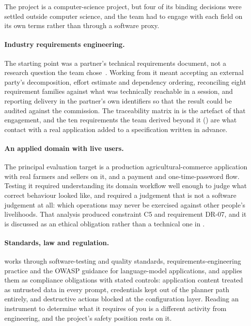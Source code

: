The project is a computer-science project, but four of its binding decisions
were settled outside computer science, and the team had to engage with each
field on its own terms rather than through a software proxy.

\paragraph{Industry requirements engineering.} The starting point was a
partner's technical requirements document, not a research question the team
chose~\cite{etatr}. Working from it meant accepting an external party's
decomposition, effort estimate and dependency ordering, reconciling eight
requirement families against what was technically reachable in a session, and
reporting delivery in the partner's own identifiers so that the result could be
audited against the commission. The traceability matrix in
 is the artefact of that engagement, and the ten
requirements the team derived beyond it () are what
contact with a real application added to a specification written in advance.

\paragraph{An applied domain with live users.} The principal evaluation target
is a production agricultural-commerce application with real farmers and sellers
on it, and a payment and one-time-password flow. Testing it required
understanding its domain workflow well enough to judge what correct behaviour
looked like, and required a judgement that is not a software judgement at all:
which operations may never be exercised against other people's livelihoods.
That analysis produced constraint C5 and requirement DR-07, and it is discussed
as an ethical obligation rather than a technical one in .

\paragraph{Standards, law and regulation.}  works through
software-testing and quality standards, requirements-engineering practice and
the OWASP guidance for language-model applications, and applies them as
compliance obligations with stated controls: application content treated as
untrusted data in every prompt, credentials kept out of the planner path
entirely, and destructive actions blocked at the configuration layer. Reading
an instrument to determine what it requires of you is a different activity from
engineering, and the project's safety position rests on it.

